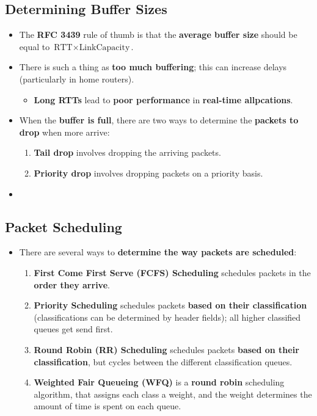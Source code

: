 \documentclass{article}
\begin{document}
    \subsection*{Determining Buffer Sizes}
    \begin{itemize}
        \item The \textbf{RFC 3439} rule of thumb is that the \textbf{average buffer size} should be equal to $\text{RTT}\times\text{LinkCapacity}$.
        \item There is such a thing as \textbf{too much buffering}; this can increase delays (particularly in home routers).
        \begin{itemize}
            \item \textbf{Long RTTs} lead to \textbf{poor performance} in \textbf{real-time allpcations}.
        \end{itemize}
        \item When the \textbf{buffer is full}, there are two ways to determine the \textbf{packets to drop} when more arrive:
        \begin{enumerate}
            \item \textbf{Tail drop} involves dropping the arriving packets.
            \item \textbf{Priority drop} involves dropping packets on a priority basis.
        \end{enumerate}
        \item 
    \end{itemize}

    \subsection*{Packet Scheduling}
    \begin{itemize}
        \item There are several ways to \textbf{determine the way packets are scheduled}:
        \begin{enumerate}
            \item \textbf{First Come First Serve (FCFS) Scheduling} schedules packets in the \textbf{order they arrive}.
            \item \textbf{Priority Scheduling} schedules packets \textbf{based on their classification} (classifications can be determined by header fields); all higher classified queues get send first.
            \item \textbf{Round Robin (RR) Scheduling} schedules packets \textbf{based on their classification}, but cycles between the different classification queues.
            \item \textbf{Weighted Fair Queueing (WFQ)} is a \textbf{round robin} scheduling algorithm, that assigns each class a weight, and the weight determines the amount of time is spent on each queue.
        \end{enumerate} 
    \end{itemize}
\end{document}
